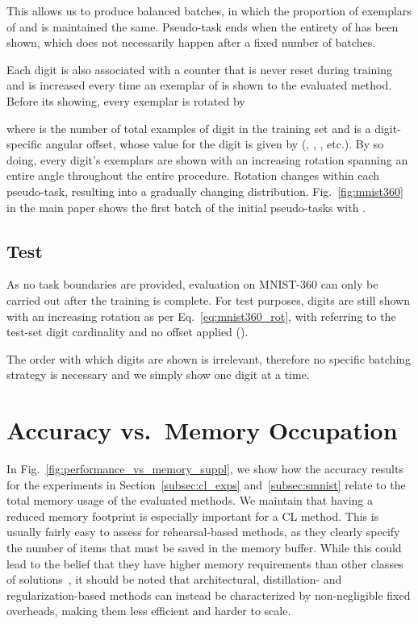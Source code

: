 \documentclass{article}
\begin{document}
This allows us to produce balanced batches, in which the proportion of exemplars of  and  is maintained the same. Pseudo-task  ends when the entirety of  has been shown, which does not necessarily happen after a fixed number of batches.

Each digit  is also associated with a counter  that is never reset during training and is increased every time an exemplar of  is shown to the evaluated method. Before its showing, every exemplar is rotated by 



where  is the number of total examples of digit  in the training set and  is a digit-specific angular offset, whose value for the  digit is given by  (, , , etc.). By so doing, every digit's exemplars are shown with an increasing rotation spanning an entire  angle throughout the entire procedure. Rotation changes within each pseudo-task, resulting into a gradually changing distribution. Fig.~\ref{fig:mnist360} in the main paper shows the first batch of the initial  pseudo-tasks with .

\subsection{Test}

As no task boundaries are provided, evaluation on MNIST-360 can only be carried out after the training is complete. For test purposes, digits are still shown with an increasing rotation as per Eq.~\ref{eq:mnist360_rot}, with  referring to the test-set digit cardinality and no offset applied ().

The order with which digits are shown is irrelevant, therefore no specific batching strategy is necessary and we simply show one digit at a time.

\section{Accuracy vs.\ Memory Occupation}
In Fig.~\ref{fig:performance_vs_memory_suppl}, we show how the accuracy results for the experiments in Section~\ref{subsec:cl_exps} and~\ref{subsec:smnist} relate to the total memory usage of the evaluated methods. We maintain that having a reduced memory footprint is especially important for a CL method. This is usually fairly easy to assess for rehearsal-based methods, as they clearly specify the number of items that must be saved in the memory buffer. While this could lead to the belief that they have higher memory requirements than other classes of solutions~\cite{chaudhry2018efficient}, it should be noted that architectural, distillation- and regularization-based methods can instead be characterized by non-negligible fixed overheads, making them less efficient and harder to scale.
\end{document}
